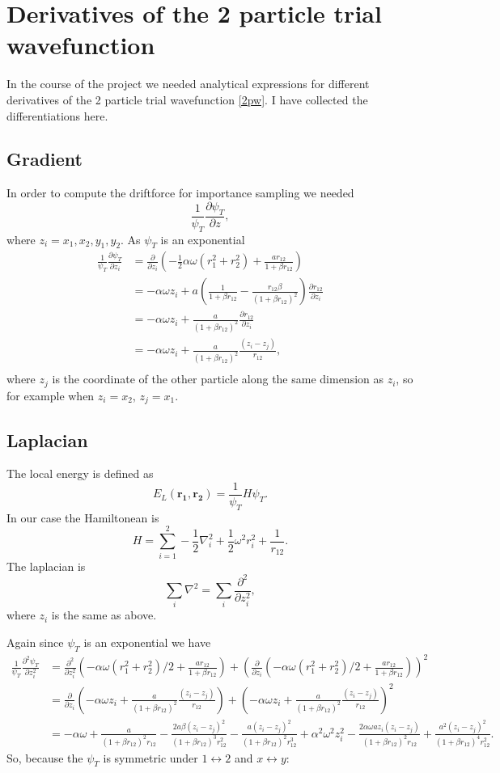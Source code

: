 \documentclass[a4paper,norsk,10pt]{article}
\newcommand{\bb}[1]{\boldsymbol{#1}}
\newcommand{\p}{\partial}
\newcommand{\pddt}[2]{\frac{\p #1}{\p #2}}
\newcommand{\pndt}[3]{\frac{\p^{#3} #1}{\p #2^{#3}}}
\newcommand{\f}{\frac}
\begin{document}
\section{Derivatives of the 2 particle trial wavefunction}
In the course of the project we needed analytical expressions for different derivatives of the 2 particle trial wavefunction \ref{2pw}. I have collected
the differentiations here.

\subsection{Gradient}\label{app2pg}
In order to compute the driftforce for importance sampling we needed
\[\f{1}{\psi_T}\pddt{\psi_T}{z},\]
where \(z_i = x_1,x_2,y_1,y_2\).
As \(\psi_T\) is an exponential
\begin{align*}
  \f{1}{\psi_T}\pddt{\psi_T}{z_i} &= \pddt{}{z_i}\left(-\f{1}{2}\alpha\omega(r_1^2+r_2^2) + \f{ar_{12}}{1+\beta r_{12}}\right)\\
  &= -\alpha\omega z_i + a\left(\f{1}{1+\beta r_{12}} - \f{r_{12}\beta}{(1+\beta r_{12})^2}\right)\pddt{r_{12}}{z_i}\\
  &= -\alpha\omega z_i + \f{a}{(1+\beta r_{12})^2}\pddt{r_{12}}{z_i}\\
  &= -\alpha\omega z_i + \f{a}{(1+\beta r_{12})^2}\f{(z_i-z_j)}{r_{12}},\\
\end{align*}
where \(z_j\) is the coordinate of the other particle along the same dimension as \(z_i\), so for example when
\(z_i=x_2\), \(z_j = x_1\).

\subsection{Laplacian}\label{applap}

The local energy is defined as
\[E_L(\bb{r_1},\bb{r_2}) = \f{1}{\psi_T}H\psi_T.\]
In our case the Hamiltonean is
\[H = \sum_{i=1}^2-\f{1}{2}\nabla_i^2+\f{1}{2}\omega^2r_i^2 + \f{1}{r_{12}}.\]
The laplacian is
\[\sum_i\nabla^2 = \sum_i\pndt{}{z_i}{2},\]
where \(z_i\) is the same as above.

Again since \(\psi_T\) is an exponential we have
\begin{align*}
  \f{1}{\psi_T}\pndt{\psi_T}{z_i}{2} &= \pndt{}{z_i}{2}\left(-\alpha\omega(r_1^2+r_2^2)/2 + \f{ar_{12}}{1+\beta r_{12}}\right) +
    \left(\pddt{}{z_i}\left(-\alpha\omega(r_1^2+r_2^2)/2 + \f{ar_{12}}{1+\beta r_{12}}\right)\right)^2\\
    &= \pddt{}{z_i}\left(-\alpha\omega z_i + \f{a}{(1+\beta r_{12})^2}\f{(z_i-z_j)}{r_{12}}\right) +
    \left(-\alpha\omega z_i + \f{a}{(1+\beta r_{12})^2}\f{(z_i-z_j)}{r_{12}}\right)^2\\
    &= -\alpha\omega + \f{a}{(1+\beta r_{12})^2r_{12}} - \f{2a\beta(z_i-z_j)^2}{(1+\beta r_{12})^3r_{12}^2}
    - \f{a(z_i-z_j)^2}{(1+\beta r_{12})^2r_{12}^3} + \alpha^2\omega^2z_i^2 -
    \f{2\alpha\omega a z_i(z_i-z_j)}{(1+\beta r_{12})^2r_{12}} + \f{a^2(z_i-z_j)^2}{(1+\beta r_{12})^4r_{12}^2}.
\end{align*}
So, because the $\psi_T$ is symmetric under $1\leftrightarrow 2$ and $x\leftrightarrow y$:
\end{document}
